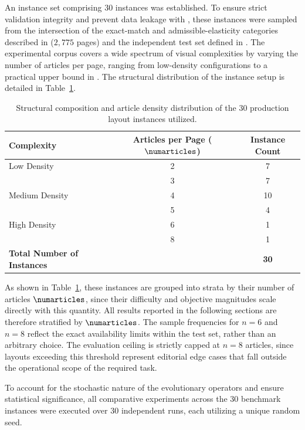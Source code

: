 An instance set comprising 30 instances was established. To ensure strict validation integrity and prevent data leakage with \neuralmethod, these instances were sampled from the intersection of the exact-match and admissible-elasticity categories described in  ($2{,}775$ pages) and the independent test set defined in . The experimental corpus covers a wide spectrum of visual complexities by varying the number of articles per page, ranging from low-density configurations to a practical upper bound in \melody. The structural distribution of the instance setup is detailed in Table~\ref{tab:instance_distribution}.

\begin{table}[htbp]
\centering
\begin{tabularx}{\linewidth}{Xcc}
\hline
\textbf{Complexity} & \textbf{Articles per Page ($\numarticles$)} & \textbf{Instance Count} \\ \hline
Low Density & 2 & 7 \\
            & 3 & 7 \\ \hline
Medium Density & 4 & 10 \\
               & 5 & 4 \\ \hline
High Density   & 6 & 1 \\
               & 8 & 1 \\ \hline
\textbf{Total Number of Instances} & & \textbf{30} \\ \hline
\end{tabularx}
\caption{Structural composition and article density distribution of the 30 production layout instances utilized.}
\label{tab:instance_distribution}
\end{table}

As shown in Table~\ref{tab:instance_distribution}, these instances are grouped into strata by their number of articles $\numarticles$, since their difficulty and objective magnitudes scale directly with this quantity. All results reported in the following sections are therefore stratified by $\numarticles$.
The sample frequencies for $n=6$ and $n=8$ reflect the exact availability limits within the  test set, rather than an arbitrary choice. The evaluation ceiling is strictly capped at $n=8$ articles, since layouts exceeding this threshold represent editorial edge cases that fall outside the operational scope of the required task.

To account for the stochastic nature of the evolutionary operators and ensure statistical significance, all comparative experiments across the 30 benchmark instances were executed over 30 independent runs, each utilizing a unique random seed.


